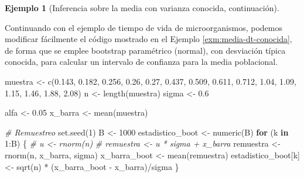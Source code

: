 \documentclass[
]{book}
\newenvironment{Shaded}{\begin{snugshade}}{\end{snugshade}}
\newcommand{\CommentTok}[1]{\textcolor[rgb]{0.56,0.35,0.01}{\textit{#1}}}
\newcommand{\ControlFlowTok}[1]{\textcolor[rgb]{0.13,0.29,0.53}{\textbf{#1}}}
\newcommand{\DecValTok}[1]{\textcolor[rgb]{0.00,0.00,0.81}{#1}}
\newcommand{\FloatTok}[1]{\textcolor[rgb]{0.00,0.00,0.81}{#1}}
\newcommand{\FunctionTok}[1]{\textcolor[rgb]{0.00,0.00,0.00}{#1}}
\newcommand{\NormalTok}[1]{#1}
\newcommand{\OtherTok}[1]{\textcolor[rgb]{0.56,0.35,0.01}{#1}}
\newcommand{\SpecialCharTok}[1]{\textcolor[rgb]{0.00,0.00,0.00}{#1}}
\theoremstyle{break}
\theoremstyle{definition}
\theoremstyle{definition}
\newtheorem{example}{Ejemplo}[chapter]
\theoremstyle{definition}
\theoremstyle{definition}
\theoremstyle{remark}
\begin{document}
\begin{example}[Inferencia sobre la media con varianza conocida, continuación]
\protect\hypertarget{exm:media-dt-conocida-par}{}{\label{exm:media-dt-conocida-par} \iffalse (Inferencia sobre la media con varianza conocida, continuación) \fi{} }
\end{example}
Continuando con el ejemplo de tiempo de vida de microorganismos,
podemos modificar fácilmente el código mostrado en el Ejemplo \ref{exm:media-dt-conocida}, de forma que se emplee bootstrap
paramétrico (normal), con desviación típica conocida, para
calcular un intervalo de confianza para la media poblacional.

\begin{Shaded}
\begin{Highlighting}[]
\NormalTok{muestra }\OtherTok{\textless{}{-}} \FunctionTok{c}\NormalTok{(}\FloatTok{0.143}\NormalTok{, }\FloatTok{0.182}\NormalTok{, }\FloatTok{0.256}\NormalTok{, }\FloatTok{0.26}\NormalTok{, }\FloatTok{0.27}\NormalTok{, }\FloatTok{0.437}\NormalTok{, }\FloatTok{0.509}\NormalTok{, }
             \FloatTok{0.611}\NormalTok{, }\FloatTok{0.712}\NormalTok{, }\FloatTok{1.04}\NormalTok{, }\FloatTok{1.09}\NormalTok{, }\FloatTok{1.15}\NormalTok{, }\FloatTok{1.46}\NormalTok{, }\FloatTok{1.88}\NormalTok{, }\FloatTok{2.08}\NormalTok{)}
\NormalTok{n }\OtherTok{\textless{}{-}} \FunctionTok{length}\NormalTok{(muestra)}
\NormalTok{sigma }\OtherTok{\textless{}{-}} \FloatTok{0.6}

\NormalTok{alfa }\OtherTok{\textless{}{-}} \FloatTok{0.05}
\NormalTok{x\_barra }\OtherTok{\textless{}{-}} \FunctionTok{mean}\NormalTok{(muestra)}

\CommentTok{\# Remuestreo}
\FunctionTok{set.seed}\NormalTok{(}\DecValTok{1}\NormalTok{)}
\NormalTok{B }\OtherTok{\textless{}{-}} \DecValTok{1000}
\NormalTok{estadistico\_boot }\OtherTok{\textless{}{-}} \FunctionTok{numeric}\NormalTok{(B)}
\ControlFlowTok{for}\NormalTok{ (k }\ControlFlowTok{in} \DecValTok{1}\SpecialCharTok{:}\NormalTok{B) \{}
    \CommentTok{\# u \textless{}{-} rnorm(n)}
    \CommentTok{\# remuestra \textless{}{-} u * sigma + x\_barra}
\NormalTok{    remuestra }\OtherTok{\textless{}{-}} \FunctionTok{rnorm}\NormalTok{(n, x\_barra, sigma)}
\NormalTok{    x\_barra\_boot }\OtherTok{\textless{}{-}} \FunctionTok{mean}\NormalTok{(remuestra)}
\NormalTok{    estadistico\_boot[k] }\OtherTok{\textless{}{-}} \FunctionTok{sqrt}\NormalTok{(n) }\SpecialCharTok{*}\NormalTok{ (x\_barra\_boot }\SpecialCharTok{{-}}\NormalTok{ x\_barra)}\SpecialCharTok{/}\NormalTok{sigma}
\NormalTok{\}}


\end{Highlighting}
\end{Shaded}
\end{document}
